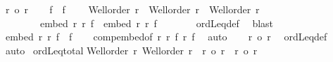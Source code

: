 \begin{isabellebody}
\ {\isachardoublequoteopen}r\ {\isasymle}o\ r{\isacharprime}{\kern0pt}{\isacharprime}{\kern0pt}{\isachardoublequoteclose}\isanewline
%
\isadelimproof
%
\endisadelimproof
%
\isatagproof
{}\isamarkupfalse%
{\isacharminus}{\kern0pt}\isanewline
\ \ \isamarkupfalse%
\ f\ \ f{\isacharprime}{\kern0pt}\isanewline
\ \ \ {}{\isacharcolon}{\kern0pt}\ {\isachardoublequoteopen}Well{\isacharunderscore}{\kern0pt}order\ r\ {\isasymand}\ Well{\isacharunderscore}{\kern0pt}order\ r{\isacharprime}{\kern0pt}\ {\isasymand}\ Well{\isacharunderscore}{\kern0pt}order\ r{\isacharprime}{\kern0pt}{\isacharprime}{\kern0pt}{\isachardoublequoteclose}\ \isanewline
\ \ \ \ \ \ \ \ {\isachardoublequoteopen}embed\ r\ r{\isacharprime}{\kern0pt}\ f{\isachardoublequoteclose}\ \ {\isachardoublequoteopen}embed\ r{\isacharprime}{\kern0pt}\ r{\isacharprime}{\kern0pt}{\isacharprime}{\kern0pt}\ f{\isacharprime}{\kern0pt}{\isachardoublequoteclose}\isanewline
\ \ \isamarkupfalse%
\ {\isacharasterisk}{\kern0pt}\ {\isacharasterisk}{\kern0pt}{\isacharasterisk}{\kern0pt}\ \isamarkupfalse%
\ ordLeq{\isacharunderscore}{\kern0pt}def\ \isamarkupfalse%
\ blast\isanewline
\ \ \isamarkupfalse%
\ {\isachardoublequoteopen}embed\ r\ r{\isacharprime}{\kern0pt}{\isacharprime}{\kern0pt}\ {\isacharparenleft}{\kern0pt}f{\isacharprime}{\kern0pt}\ {\isasymcirc}\ f{\isacharparenright}{\kern0pt}{\isachardoublequoteclose}\isanewline
\ \ \isamarkupfalse%
\ comp{\isacharunderscore}{\kern0pt}embed{\isacharbrackleft}{\kern0pt}of\ r\ r{\isacharprime}{\kern0pt}\ f\ r{\isacharprime}{\kern0pt}{\isacharprime}{\kern0pt}\ f{\isacharprime}{\kern0pt}{\isacharbrackright}{\kern0pt}\ \isamarkupfalse%
\ auto\isanewline
\ \ \isamarkupfalse%
\ {\isachardoublequoteopen}r\ {\isasymle}o\ r{\isacharprime}{\kern0pt}{\isacharprime}{\kern0pt}{\isachardoublequoteclose}\ \isamarkupfalse%
\ ordLeq{\isacharunderscore}{\kern0pt}def\ \isamarkupfalse%
\ {}\ \isamarkupfalse%
\ auto\isanewline
{}\isamarkupfalse%
%
\endisatagproof
{\isafoldproof}%
%
\isadelimproof
\isanewline
%
\endisadelimproof
\isanewline
{}\isamarkupfalse%
\ ordLeq{\isacharunderscore}{\kern0pt}total{\isacharcolon}{\kern0pt}\isanewline
{\isachardoublequoteopen}{\isasymlbrakk}Well{\isacharunderscore}{\kern0pt}order\ r{\isacharsemicolon}{\kern0pt}\ Well{\isacharunderscore}{\kern0pt}order\ r{\isacharprime}{\kern0pt}{\isasymrbrakk}\ {\isasymLongrightarrow}\ r\ {\isasymle}o\ r{\isacharprime}{\kern0pt}\ {\isasymor}\ r{\isacharprime}{\kern0pt}\ {\isasymle}o\ r{\isachardoublequoteclose}\isanewline

\end{isabellebody}
